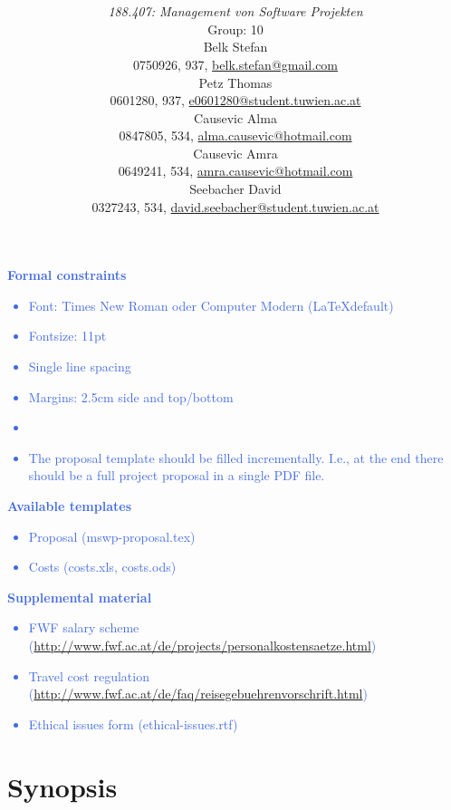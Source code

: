 \documentclass[a4paper,11pt]{article}
\title{\textbf{\sffamily\Huge \ShortTitle}\\ 
{\textbf{\sffamily\Large \FullTitle}}
\vspace{1cm}}
\author{
{\em 188.407: Management von Software Projekten} \vspace{1cm} \\
Group: 10\bigskip \\
Belk Stefan \\ {\small 0750926, 937, \href{mailto:belk.stefan@gmail.com}{belk.stefan@gmail.com}}\\
Petz Thomas \\ {\small 0601280, 937, \href{mailto:e0601280@student.tuwien.ac.at}{e0601280@student.tuwien.ac.at}}\\
Causevic Alma \\ {\small 0847805, 534, \href{mailto:alma.causevic@hotmail.com}{alma.causevic@hotmail.com}}\\ 
Causevic Amra  \\ {\small 0649241, 534, \href{mailto:amra.causevic@hotmail.com}{amra.causevic@hotmail.com}}\\ 
Seebacher David \\ {\small 0327243, 534, \href{mailto:david.seebacher@student.tuwien.ac.at}{david.seebacher@student.tuwien.ac.at}}\\
\vspace{4cm}
}
\providecommand*{\note}[1]{\small \textcolor{RoyalBlue}{\begin{minipage}{\textwidth}{#1}\end{minipage}}}
\begin{document}
\begin{titlepage}
\maketitle

\end{titlepage}


\thispagestyle{empty}
\tableofcontents
\pagebreak

\setcounter{page}{1}



\note{
\textbf{Formal constraints}
\begin{itemize}
\item	  Font: Times New Roman oder Computer Modern (\LaTeX default)
\item    Fontsize: 11pt
\item     Single line spacing
\item     Margins: 2.5cm side and top/bottom
\item     \fbox{Language: ENGLISH}
\item    The proposal template should be filled incrementally. I.e., at the end there should be a full project proposal in a single PDF file.
\end{itemize}
\textbf{Available templates}
\begin{itemize}
\item     Proposal (mswp-proposal.tex)
\item     Costs (costs.xls, costs.ods)
\end{itemize}
\textbf{Supplemental material}
\begin{itemize}
\item     FWF salary scheme (\href{http://www.fwf.ac.at/de/projects/personalkostensaetze.html}{http://www.fwf.ac.at/de/projects/personalkostensaetze.html})
\item     Travel cost regulation (\href{http://www.fwf.ac.at/de/faq/reisegebuehrenvorschrift.html}{http://www.fwf.ac.at/de/faq/reisegebuehrenvorschrift.html})
\item     Ethical issues form (ethical-issues.rtf)
\end{itemize}
}
\pagebreak

\section{Synopsis}
\label{sect:synopsis}
\end{document}

